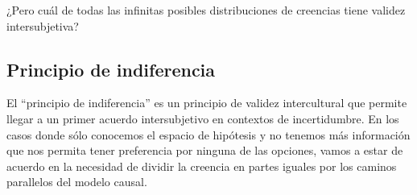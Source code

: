 \documentclass[a4paper,10pt]{book}
\theoremstyle{definition}
\begin{document}

¿Pero cuál de todas las infinitas posibles distribuciones de creencias tiene validez intersubjetiva?

\subsection{Principio de indiferencia}\label{sec:principio_indiferencia}

El ``principio de indiferencia'' es un principio de validez intercultural que permite llegar a un primer acuerdo intersubjetivo en contextos de incertidumbre.
%
En los casos donde sólo conocemos el espacio de hipótesis y no tenemos más información que nos permita tener preferencia por ninguna de las opciones, vamos a estar de acuerdo en la necesidad de dividir la creencia en partes iguales por los caminos parallelos del modelo causal.
%
\end{document}

